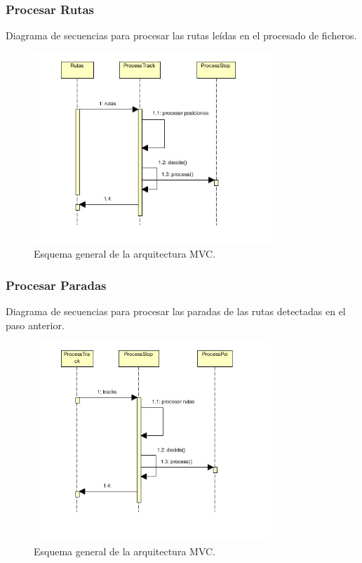\subsubsection{Procesar Rutas}
Diagrama de secuencias para procesar las rutas leídas en el procesado de ficheros.
\begin{figure}[!htbp]
  \centering
    \includegraphics[width=0.8\textwidth]{../img/diagramas/secuencias/8.jpg}
  \caption{Esquema general de la arquitectura MVC.}
  \label{mvc}
\end{figure}

\subsubsection{Procesar Paradas}
Diagrama de secuencias para procesar las paradas de las rutas detectadas en el paso anterior.
\begin{figure}[!htbp]
  \centering
    \includegraphics[width=0.8\textwidth]{../img/diagramas/secuencias/9.jpg}
  \caption{Esquema general de la arquitectura MVC.}
  \label{mvc}
\end{figure}


